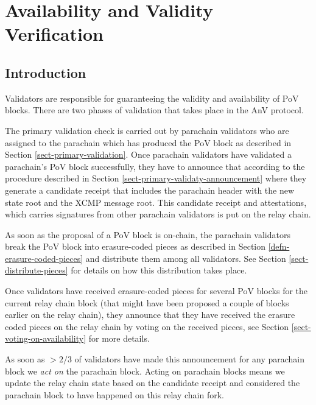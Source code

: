 \chapter{Availability and Validity Verification}

\section{Introduction}

Validators are responsible for guaranteeing the validity and availability of PoV
blocks. There are two phases of validation that takes place in the AnV protocol.
\newline

The primary validation check is carried out by parachain validators who are
assigned to the parachain which has produced the PoV block as described in
Section \ref{sect-primary-validation}. Once parachain validators have validated
a parachain's PoV block successfully, they have to announce that according to
the procedure described in Section \ref{sect-primary-validaty-announcement}
where they generate a candidate receipt that includes the parachain header with
the new state root and the XCMP message root. This candidate receipt and
attestations, which carries signatures from other parachain validators is put on
the relay chain.
\newline

As soon as the proposal of a PoV block is on-chain, the parachain validators
break the PoV block into erasure-coded pieces as described in Section
\ref{defn-erasure-coded-pieces} and distribute them among all validators. See
Section \ref{sect-distribute-pieces} for details on how this distribution takes
place.
\newline

Once validators have received erasure-coded pieces for several PoV blocks for
the current relay chain block (that might have been proposed a couple of blocks
earlier on the relay chain), they announce that they have received the erasure
coded pieces on the relay chain by voting on the received pieces, see Section
\ref{sect-voting-on-availability} for more details.
\newline

As soon as $>2/3$ of validators have made this announcement for any parachain
block we \emph{act on} the parachain block. Acting on parachain blocks means we
update the relay chain state based on the candidate receipt and considered the
parachain block to have happened on this relay chain fork.
\newline

